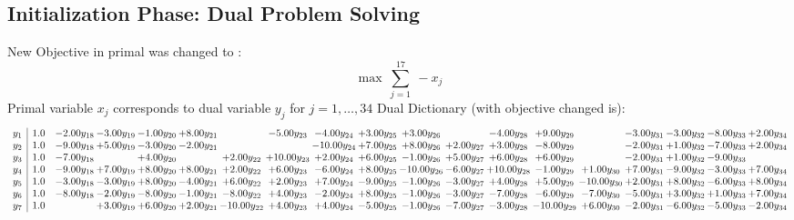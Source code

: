 \documentclass[9pt]{article}
\begin{document}
\subsection{Initialization Phase: Dual Problem Solving}
New Objective in primal was changed to : \[ \max\ \sum_{j=1}^{17}\ - x_j \] 
Primal variable $x_j$ corresponds to dual variable $y_j$ for $j = 1,\ldots,34$
Dual Dictionary (with objective changed is): 
\[\begin{array}{c| c c@{\hskip 2pt} c@{\hskip 2pt} c@{\hskip 2pt} c@{\hskip 2pt} c@{\hskip 2pt} c@{\hskip 2pt} c@{\hskip 2pt} c@{\hskip 2pt} c@{\hskip 2pt} c@{\hskip 2pt} c@{\hskip 2pt} c@{\hskip 2pt} c@{\hskip 2pt} c@{\hskip 2pt} c@{\hskip 2pt} c@{\hskip 2pt} c@{\hskip 2pt} }
 y_{1}   &  1.0 & -2.00 y_{18} & -3.00 y_{19} & -1.00 y_{20} & +  8.00 y_{21} &   & -5.00 y_{23} & -4.00 y_{24} & +  3.00 y_{25} & +  3.00 y_{26} &   & -4.00 y_{28} & +  9.00 y_{29} &   & -3.00 y_{31} & -3.00 y_{32} & -8.00 y_{33} & +  2.00 y_{34}\\
 y_{2}   &  1.0 & -9.00 y_{18} & +  5.00 y_{19} & -3.00 y_{20} & -2.00 y_{21} &    &   & -10.00 y_{24} & +  7.00 y_{25} & +  8.00 y_{26} & +  2.00 y_{27} & +  3.00 y_{28} & -8.00 y_{29} &   & -2.00 y_{31} & +  1.00 y_{32} & -7.00 y_{33} & +  2.00 y_{34}\\
 y_{3}   &  1.0 & -7.00 y_{18} &   & +  4.00 y_{20} &   & +  2.00 y_{22} & + 10.00 y_{23} & +  2.00 y_{24} & +  6.00 y_{25} & -1.00 y_{26} & +  5.00 y_{27} & +  6.00 y_{28} & +  6.00 y_{29} &   & -2.00 y_{31} & +  1.00 y_{32} & -9.00 y_{33} &   \\
 y_{4}   &  1.0 & -9.00 y_{18} & +  7.00 y_{19} & +  8.00 y_{20} & +  8.00 y_{21} & +  2.00 y_{22} & +  6.00 y_{23} & -6.00 y_{24} & +  8.00 y_{25} & -10.00 y_{26} & -6.00 y_{27} & + 10.00 y_{28} & -1.00 y_{29} & +  1.00 y_{30} & +  7.00 y_{31} & -9.00 y_{32} & -3.00 y_{33} & +  7.00 y_{34}\\
 y_{5}   &  1.0 & -3.00 y_{18} & -3.00 y_{19} & +  8.00 y_{20} & -4.00 y_{21} & +  6.00 y_{22} & +  2.00 y_{23} & +  7.00 y_{24} & -9.00 y_{25} & -1.00 y_{26} & -3.00 y_{27} & +  4.00 y_{28} & +  5.00 y_{29} & -10.00 y_{30} & +  2.00 y_{31} & +  8.00 y_{32} & -6.00 y_{33} & +  8.00 y_{34}\\
 y_{6}   &  1.0 & -8.00 y_{18} & -2.00 y_{19} & -8.00 y_{20} & -1.00 y_{21} & -8.00 y_{22} & +  4.00 y_{23} & -2.00 y_{24} & +  8.00 y_{25} & -1.00 y_{26} & -3.00 y_{27} & -7.00 y_{28} & -6.00 y_{29} & -7.00 y_{30} & -5.00 y_{31} & +  3.00 y_{32} & +  1.00 y_{33} & +  7.00 y_{34}\\
 y_{7}   &  1.0  &   & +  3.00 y_{19} & +  6.00 y_{20} & +  2.00 y_{21} & -10.00 y_{22} & +  4.00 y_{23} & +  4.00 y_{24} & -5.00 y_{25} & -1.00 y_{26} & -7.00 y_{27} & -3.00 y_{28} & -10.00 y_{29} & +  6.00 y_{30} & -2.00 y_{31} & -6.00 y_{32} & -5.00 y_{33} & -2.00 y_{34}\\

\end{array}\]
\end{document}
